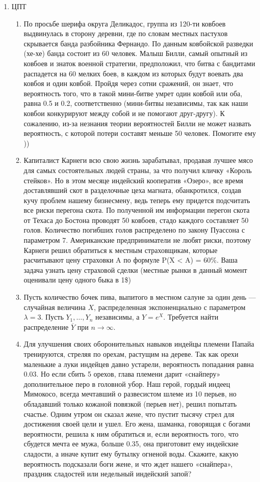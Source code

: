 \documentclass[11pt, a4paper]{article}
\theoremstyle{definition}
\begin{document}
\begin{enumerate}
    \item ЦПТ
\begin{enumerate}

    \item По просьбе шерифа округа Деликадос, группа из 120-ти ковбоев выдвинулась в сторону деревни, где по словам местных пастухов скрывается банда разбойника Фернандо. По данным ковбойской разведки (хе-хе) банда состоит из 60 человек. Малыш Билли, самый опытный из ковбоев и знаток военной стратегии, предположил, что битва с бандитами распадется на 60 мелких боев, в каждом из которых будут воевать два ковбоя и один ковбой. Пройдя через сотни сражений, он знает, что вероятность того, что в такой мини-битве умрет один ковбой или оба, равна 0.5 и 0.2, соответственно (мини-битвы независимы, так как наши ковбои конкурируют между собой и не помогают друг-другу). К сожалению, из-за незнания теории вероятностей Билли не может назвать вероятность, с которой потери составят меньше 50 человек. Помогите ему ))
    \newpage
    \item Капиталист Карнеги всю свою жизнь зарабатывал, продавая лучшее мясо для самых состоятельных людей страны, за что получил кличку «Король стейков». Но в этом месяце индейский кооператив «Озеро», все время доставлявший скот в разделочные цеха магната, обанкротился, создав кучу проблем нашему бизнесмену, ведь теперь ему придется подсчитать все риски перегона скота. По полученной им информации перегон скота от Техаса до Бостона проводят 50 ковбоев, стадо каждого составляет 50 голов. Количество погибших голов распределено по закону Пуассона с параметром 7. Американские предприниматели не любят риски, поэтому Карнеги решил обратиться к местным страховщикам,  которые расчитывают цену страховки A по формуле P(X < A) = 60\%. Ваша задача узнать цену страховой сделки (местные рынки в данный момент оценивали цену одного быка в 1\$) 
    
    
     \item Пусть количество бочек пива, выпитого в местном салуне за один день — случайная величина $X$, распределенная экспоненциально с параметром $\lambda=3$. Пусть $Y_1, \ldots, Y_n$ независимы, а $Y=e^X$. Требуется найти распределение $\overline{Y}$ при $n \rightarrow \infty$.
    \newpage
    
    \item Для улучшения своих оборонительных навыков индейцы племени Папайа тренируются, стреляя по орехам, растущим на дереве. Так как орехи маленькие а луки индейцев давно устарели, вероятность попадания равна 0.03. Но если сбить 5 орехов, глава племени дарит «снайперу» дополнительное перо в головной убор. Наш герой, гордый индеец Мимокосо, всегда мечтавший о развесистом шлеме из 10 перьев, но обладавший только кожаной повязкой (перьев нет), решил попытать счастье. Одним утром он сказал жене, что пустит тысячу стрел для достижения своей цели и ушел. Его жена, шаманка, говорящая с богами вероятности, решила к ним обратиться и, если вероятность того, что сбудется мечта ее мужа, больше 0.35, она приготовит ему индейские сладости, а иначе купит ему бутылку огненой воды. Скажите, какую вероятность подсказали боги жене, и что ждет нашего «снайпера», праздник сладостей или недельный индейский запой? 
    

\end{enumerate}
\end{enumerate}
\end{document}

